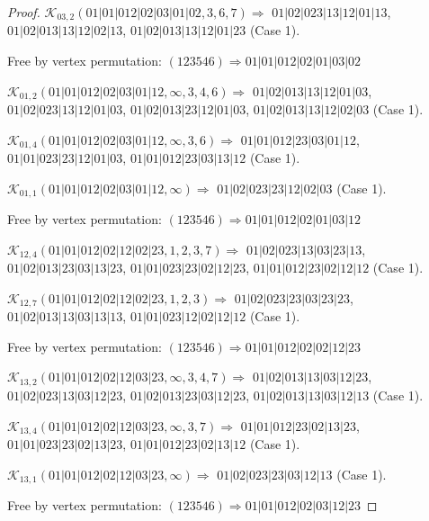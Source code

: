 \documentclass[12pt]{article}
\theoremstyle{plain}
\theoremstyle{definition}
\theoremstyle{remark}
\newcommand{\fancy}[1]{\mathcal{#1}}
\def\K{\fancy{K}}
\begin{document}
\begin{proof}
	$\K_{03,2}(01|01|012|02|03|01|02,3, 6, 7)\Rightarrow $ $01|02|023|13|12|01|13$, $01|02|013|13|12|02|13$, $01|02|013|13|12|01|23$ (Case 1).
	
	
	
	Free by vertex permutation: $(1 2 3 5 4 6)\Rightarrow 01|01|012|02|01|03|02$
	
	
	
	\bigskip
	
	$\K_{01,2}(01|01|012|02|03|01|12,\infty,3, 4, 6)\Rightarrow $ $01|02|013|13|12|01|03$, $01|02|023|13|12|01|03$, $01|02|013|23|12|01|03$, $01|02|013|13|12|02|03$ (Case 1).
	
	$\K_{01,4}(01|01|012|02|03|01|12,\infty,3, 6)\Rightarrow $ $01|01|012|23|03|01|12$, $01|01|023|23|12|01|03$, $01|01|012|23|03|13|12$ (Case 1).
	
	$\K_{01,1}(01|01|012|02|03|01|12,\infty)\Rightarrow $ $01|02|023|23|12|02|03$ (Case 1).
	
	
	
	Free by vertex permutation: $(1 2 3 5 4 6)\Rightarrow 01|01|012|02|01|03|12$
	
	
	
	\bigskip
	
	$\K_{12,4}(01|01|012|02|12|02|23,1, 2, 3, 7)\Rightarrow $ $01|02|023|13|03|23|13$, $01|02|013|23|03|13|23$, $01|01|023|23|02|12|23$, $01|01|012|23|02|12|12$ (Case 1).
	
	$\K_{12,7}(01|01|012|02|12|02|23,1, 2, 3)\Rightarrow $ $01|02|023|23|03|23|23$, $01|02|013|13|03|13|13$, $01|01|023|12|02|12|12$ (Case 1).
	
	
	
	Free by vertex permutation: $(1 2 3 5 4 6)\Rightarrow 01|01|012|02|02|12|23$
	
	
	
	\bigskip
	
	$\K_{13,2}(01|01|012|02|12|03|23,\infty,3, 4, 7)\Rightarrow $ $01|02|013|13|03|12|23$, $01|02|023|13|03|12|23$, $01|02|013|23|03|12|23$, $01|02|013|13|03|12|13$ (Case 1).
	
	$\K_{13,4}(01|01|012|02|12|03|23,\infty,3, 7)\Rightarrow $ $01|01|012|23|02|13|23$, $01|01|023|23|02|13|23$, $01|01|012|23|02|13|12$ (Case 1).
	
	$\K_{13,1}(01|01|012|02|12|03|23,\infty)\Rightarrow $ $01|02|023|23|03|12|13$ (Case 1).
	
	
	
	Free by vertex permutation: $(1 2 3 5 4 6)\Rightarrow 01|01|012|02|03|12|23$
	
	
	

\end{proof}
\end{document}
